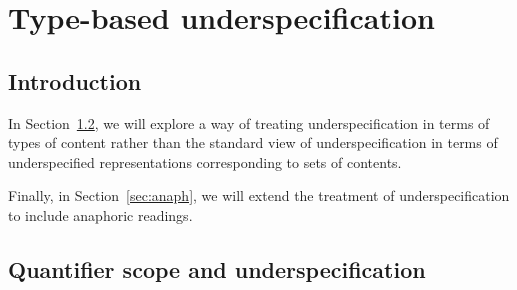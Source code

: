 \chapter{Type-based underspecification}
\label{ch:underspec}
\setcounter{equation}{0}

\section{Introduction}

In Section~\ref{sec:qscope-underspec}, we will explore a way
of treating underspecification in terms of types of content rather
than the standard view of underspecification in terms of
underspecified representations corresponding to sets of contents.

Finally, in Section~\ref{sec:anaph}, we will extend the treatment of
underspecification to include anaphoric readings.

\section{Quantifier scope and underspecification}
\label{sec:qscope-underspec}

